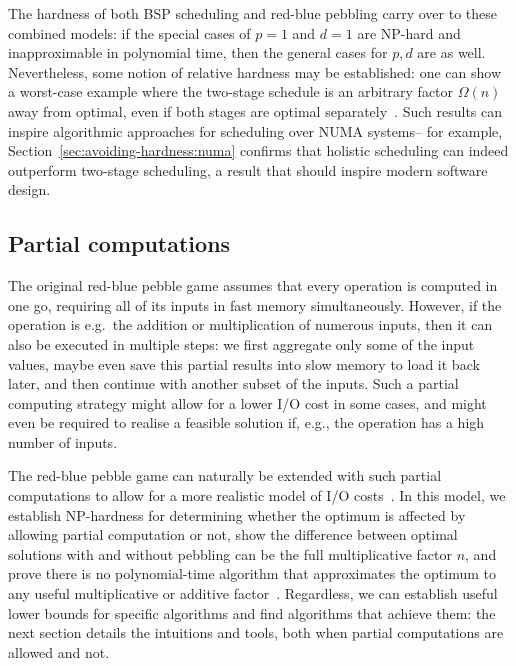 \documentclass[oneside,reqno, a4paper]{amsart}
\numberwithin{equation}{section}
\newcommand{\ajy}[1]{{\color{orange} \sf AJY: [#1]}}
\begin{document}
The hardness of both BSP scheduling and red-blue pebbling carry over to these combined models:
if the special cases of $p=1$ and $d=1$ are NP-hard and inapproximable in polynomial time,
then the general cases for $p,d$ are as well.
Nevertheless,
some notion of relative hardness may be established:
one can show a worst-case example where the two-stage schedule is an arbitrary factor $\Omega(n)$ away from optimal,
even if both stages are optimal separately~\cite{MPP_opdas}.
Such results can inspire algorithmic approaches for scheduling over NUMA systems--
for example, Section~\ref{sec:avoiding-hardness:numa} confirms that holistic scheduling can indeed outperform two-stage scheduling, %
a result that should inspire modern software design. %

\subsection{Partial computations}
\label{sec:partial-pebbling}
\label{sec:scheduling-is-hard:partial}


The original red-blue pebble game assumes that every operation is computed in one go, requiring all of its inputs in fast memory simultaneously. However, if the operation is e.g.\ the addition or multiplication of numerous inputs, then it can also be executed in multiple steps: we first aggregate only some of the input values, maybe even save this partial results into slow memory to load it back later, and then continue with another subset of the inputs. Such a partial computing strategy might allow for a lower I/O cost in some cases, and might even be required to realise a feasible solution if, e.g., the operation has a high number of inputs.

The red-blue pebble game can naturally be extended with such partial computations to allow for a more realistic model of I/O costs~\cite{sobczyk2026complexity,partial_opdas}.
In this model,
we establish NP-hardness for determining whether the optimum is affected by allowing partial computation or not,
show the difference between optimal solutions with and without pebbling can be the full multiplicative factor $n$,
and prove there is no polynomial-time algorithm that approximates the optimum to any useful multiplicative or additive factor~\cite{partial_opdas}.
Regardless,
we can establish useful lower bounds for specific algorithms and find algorithms that achieve them:
the next section details the intuitions and tools,
both when partial computations are allowed and not.
\end{document}

